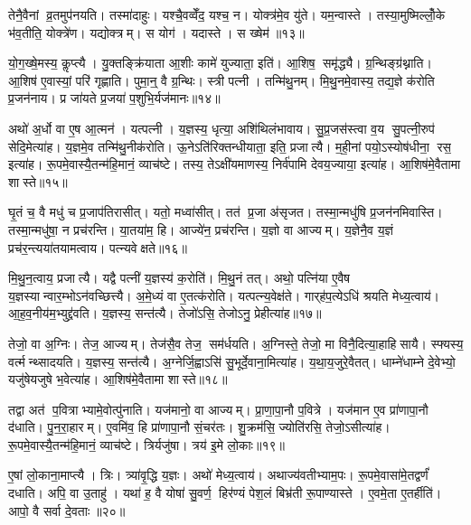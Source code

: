 तेनै॒वैनां व्र॒तमुप॑नयति। तस्मा॑दाहुः। यश्चै॒वव्वेँद॒ यश्च॒ न। योक्त्र॑मे॒व यु॑ते। यम॒न्वास्ते। तस्या॒मुष्मिल्लोँ॒के भ॑व॒तीति॒ योक्त्रे॑ण। यद्योक्त्रम्। स योग॑। यदास्ते। स ख्षेम॑॥१३॥

यो॒ग॒ख्षे॒मस्य॒ कॢप्त्यै। यु॒क्तङ्क्रि॑याता आ॒शीः कामे॑ युज्याता॒ इति॑। आ॒शिष॒ समृ॑द्ध्यै। ग्र॒न्थिङ्ग्र॑थ्नाति। आ॒शिष॑ ए॒वास्यां॒ परि॑ गृह्णाति। पुमा॒न्॒ वै ग्र॒न्थिः। स्त्री पत्नी। तन्मि॑थु॒नम्। मि॒थु॒नमे॒वास्य॒ तद्य॒ज्ञे क॑रोति प्र॒जन॑नाय। प्र जा॑यते प्र॒जया॑ प॒शुभि॒र्यज॑मानः॥१४॥

अथो॑ अ॒र्धो वा ए॒ष आ॒त्मन॑। यत्पत्नी। य॒ज्ञस्य॒ धृत्या॒ अशि॑थिलंभावाय। सु॒प्र॒जस॑स्त्वा व॒य सु॒पत्नी॒रुप॑ सेदि॒मेत्या॑ह। य॒ज्ञमे॒व तन्मि॑थु॒नीक॑रोति। ऊ॒नेऽति॑रिक्तन्धीयाता॒ इति॒ प्रजात्यै। म॒ही॒नां पयो॒ऽस्योष॑धीना॒ रस॒ इत्या॑ह। रू॒पमे॒वास्यै॒तन्म॑हि॒मानं॒ व्याच॑ष्टे। तस्य॒ तेऽक्षी॑यमाणस्य॒ निर्व॑पामि देवय॒ज्याया॒ इत्या॑ह। आ॒शिष॑मे॒वैतामा शास्ते॥१५॥\anuvakamend[क॒रोति॑ व्रतोप॒नय॑नं॒ क्षेमो॒ यज॑मानश्शास्ते]

घृ॒तं च॒ वै मधु॑ च प्र॒जाप॑तिरासीत्। यतो॒ मध्वा॑सीत्। तत॑ प्र॒जा अ॑सृजत। तस्मा॒न्मधु॑षि प्र॒जन॑नमिवास्ति। तस्मा॒न्मधु॑षा॒ न प्रच॑रन्ति। या॒तया॑म॒ हि। आज्ये॑न॒ प्रच॑रन्ति। य॒ज्ञो वा आज्यम्। य॒ज्ञेनै॒व य॒ज्ञं प्रच॑र॒न्त्यया॑तयामत्वाय। पत्न्यवेक्षते॥१६॥

मि॒थु॒न॒त्वाय॒ प्रजात्यै। यद्वै पत्नी॑ य॒ज्ञस्य॑ क॒रोति॑। मि॒थु॒नं तत्। अथो॒ पत्नि॑या ए॒वैष य॒ज्ञस्यान्वार॒म्भोऽन॑वच्छित्त्यै। अ॒मे॒ध्यं वा ए॒तत्क॑रोति। यत्पत्न्य॒वेक्ष॑ते। गार्‌ह॑प॒त्येऽधि॑ श्रयति मेध्य॒त्वाय॑। आ॒ह॒व॒नीय॑म॒भ्युद्द्र॑वति। य॒ज्ञस्य॒ सन्त॑त्यै। तेजो॑ऽसि॒ तेजोऽनु॒ प्रेहीत्या॑ह॥१७॥

तेजो॒ वा अ॒ग्निः। तेज॒ आज्यम्। तेज॑सै॒व तेज॒ सम॑र्धयति। अ॒ग्निस्ते॒ तेजो॒ मा विनै॒दित्या॒हाहिसायै। स्फ्यस्य॒ वर्त्मन्थ्सादयति। य॒ज्ञस्य॒ सन्त॑त्यै। अ॒ग्नेर्जि॒ह्वाऽसि॑ सु॒भूर्दे॒वाना॒मित्या॑ह। य॒था॒य॒जुरे॒वैतत्। धाम्ने॑धाम्ने दे॒वेभ्यो॒ यजु॑षेयजुषे भ॒वेत्या॑ह। आ॒शिष॑मे॒वैतामा शास्ते॥१८॥

तद्वा अत॑ प॒वित्राभ्यामे॒वोत्पु॑नाति। यज॑मानो॒ वा आज्यम्। प्रा॒णा॒पा॒नौ प॒वित्रे। यज॑मान ए॒व प्रा॑णापा॒नौ द॑धाति। पु॒न॒रा॒हारम्। ए॒वमि॑व॒ हि प्रा॑णापा॒नौ सं॒चर॑तः। शु॒क्रम॑सि॒ ज्योति॑रसि॒ तेजो॒ऽसीत्या॑ह। रू॒पमे॒वास्यै॒तन्म॑हि॒मानं॒ व्याच॑ष्टे। त्रिर्यजु॑षा। त्रय॑ इ॒मे लो॒काः॥१९॥

ए॒षां लो॒काना॒माप्त्यै। त्रिः। त्र्या॑वृ॒द्धि य॒ज्ञः। अथो॑ मेध्य॒त्वाय॑। अथाज्य॑वतीभ्याम॒पः। रू॒पमे॒वासा॑मे॒तद्वर्णं॑ दधाति। अपि॒ वा उ॒ताहु॑। यथा॑ ह॒ वै योषा॑ सु॒वर्ण॒ हिर॑ण्यं पेश॒लं बिभ्र॑ती रू॒पाण्यास्ते। ए॒वमे॒ता ए॒तर्\mbox{}हीति॑। आपो॒ वै सर्वा दे॒वताः॥२०॥

